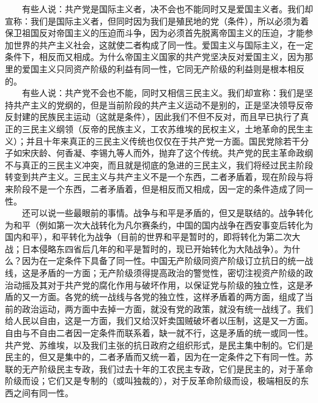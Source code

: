 \documentclass[cn,11pt,chinese]{elegantbook}
\begin{document}
　　有些人说：共产党是国际主义者，决不会也不能同时又是爱国主义者。我们却宣称：我们是国际主义者，但同时因为我们是殖民地的党（条件），所以必须为着保卫祖国反对帝国主义的压迫而斗争，因为必须首先脱离帝国主义的压迫，才能参加世界的共产主义社会，这就使二者构成了同一性。爱国主义与国际主义，在一定条件下，相反而又相成。为什么帝国主义国家的共产党坚决反对爱国主义，因为那里的爱国主义只同资产阶级的利益有同一性，它同无产阶级的利益则是根本相反的。\\
　　有些人说：共产党不会也不能，同时又相信三民主义。我们却宣称：我们是坚持共产主义的党纲的，但是当前阶段的共产主义运动不是别的，正是坚决领导反帝反封建的民族民主运动（这就是条件），因此我们不但不反对，而且早已执行了真正的三民主义纲领（反帝的民族主义，工农苏维埃的民权主义，土地革命的民生主义）；并且十年来真正的三民主义传统也仅仅在于共产党一方面。国民党除若干分子如宋庆龄、何香凝、李锡九等人而外，抛弃了这个传统。共产党的民主革命政纲不与真正的三民主义冲突，而且就是彻底的急进的三民主义，我们将经过民主阶段转变到共产主义。三民主义与共产主义不是一个东西，二者矛盾着，现在阶段与将来阶段不是一个东西，二者矛盾着，但是相反而又相成，因一定的条件造成了同一性。\\
　　还可以说一些最眼前的事情。战争与和平是矛盾的，但又是联结的。战争转化为和平（例如第一次大战转化为凡尔赛条约，中国的国内战争在西安事变后转化为国内和平），和平转化为战争（目前的世界和平是暂时的，即将转化为第二次大战；日本侵略东四省后几年的和平是暂时的，现已开始转化为大陆战争）。为什么？因为在一定条件下具备了同一性。中国无产阶级同资产阶级订立抗日的统一战线，这是矛盾的一方面；无产阶级须得提高政治的警觉性，密切注视资产阶级的政治动摇及其对于共产党的腐化作用与破坏作用，以保证党与阶级的独立性，这是矛盾的又一方面。各党的统一战线与各党的独立性，这样矛盾着的两方面，组成了当前的政治运动，两方面中去掉一方面，就没有党的政策，就没有统一战线了。我们给人民以自由，这是一方面，我们又给汉奸卖国贼破坏者以压制，这是又一方面。自由与不自由二者因一定条件而联系着，缺一就不行，这是矛盾的统一或同一性。共产党、苏维埃，以及我们主张的抗日政府之组织形式，是民主集中制的。它们是民主的，但又是集中的，二者矛盾而又统一着，因为在一定条件之下有同一性。苏联的无产阶级民主专政，我们过去十年的工农民主专政，它们是民主的，对于革命阶级而设；它们又是专制的（或叫独裁的），对于反革命阶级而设，极端相反的东西之间有同一性。\\
\end{document}
